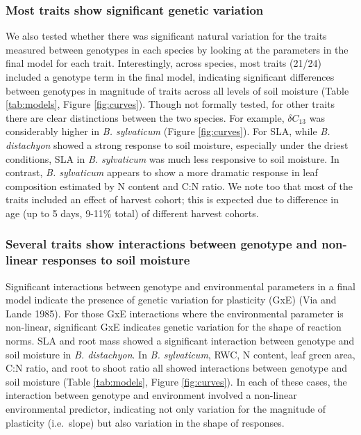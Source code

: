 \documentclass[jou,floatsintext]{apa6}
\begin{document}
\hypertarget{most-traits-show-significant-genetic-variation}{%
\subsubsection{Most traits show significant genetic variation}\label{most-traits-show-significant-genetic-variation}}

We also tested whether there was significant natural variation for the traits measured between genotypes in each species by looking at the parameters in the final model for each trait. Interestingly, across species, most traits (21/24) included a genotype term in the final model, indicating significant differences between genotypes in magnitude of traits across all levels of soil moisture (Table \ref{tab:models}, Figure \ref{fig:curves}). Though not formally tested, for other traits there are clear distinctions between the two species. For example, \(\delta C_{13}\) was considerably higher in \emph{B. sylvaticum} (Figure \ref{fig:curves}). For SLA, while \emph{B. distachyon} showed a strong response to soil moisture, especially under the driest conditions, SLA in \emph{B. sylvaticum} was much less responsive to soil moisture. In contrast, \emph{B. sylvaticum} appears to show a more dramatic response in leaf composition estimated by N content and C:N ratio. We note too that most of the traits included an effect of harvest cohort; this is expected due to difference in age (up to 5 days, 9-11\% total) of different harvest cohorts.

\hypertarget{several-traits-show-interactions-between-genotype-and-non-linear-responses-to-soil-moisture}{%
\subsubsection{Several traits show interactions between genotype and non-linear responses to soil moisture}\label{several-traits-show-interactions-between-genotype-and-non-linear-responses-to-soil-moisture}}

Significant interactions between genotype and environmental parameters in a final model indicate the presence of genetic variation for plasticity (GxE) (Via and Lande 1985). For those GxE interactions where the environmental parameter is non-linear, significant GxE indicates genetic variation for the shape of reaction norms. SLA and root mass showed a significant interaction between genotype and soil moisture in \emph{B. distachyon}. In \emph{B. sylvaticum}, RWC, N content, leaf green area, C:N ratio, and root to shoot ratio all showed interactions between genotype and soil moisture (Table \ref{tab:models}, Figure \ref{fig:curves}). In each of these cases, the interaction between genotype and environment involved a non-linear environmental predictor, indicating not only variation for the magnitude of plasticity (i.e.~slope) but also variation in the shape of responses.
\end{document}
